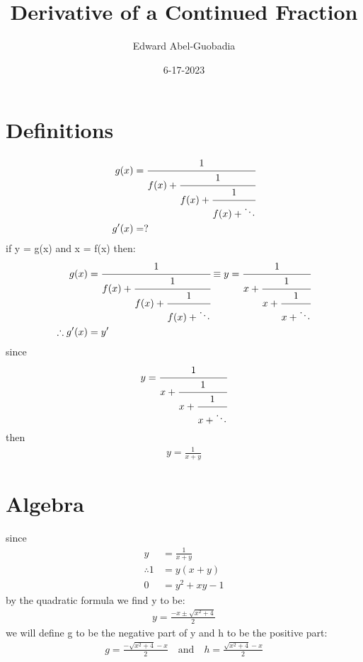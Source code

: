 \documentclass[a4paper]{article}
\title{Derivative of a Continued Fraction}
\author{Edward Abel-Guobadia}
\date{6-17-2023}
\begin{document}
\maketitle
\newpage
\section*{Definitions}
\begin{align}
    g(x) &= \cfrac{1}{f(x) + \cfrac{1}{f(x) + \cfrac{1}{f(x) + \ddots}}}\\
    g^\prime(x) &= ?
\end{align}
if y = g(x) and x = f(x)
then:
\begin{align}
    g(x) &= \cfrac{1}{f(x) + \cfrac{1}{f(x) + \cfrac{1}{f(x) + \ddots}}}
    \equiv y = \cfrac{1}{x + \cfrac{1}{x + \cfrac{1}{x + \ddots}}}\\
    \therefore g^\prime(x) &= y^\prime
\end{align}
since
\begin{align}
    y = \cfrac{1}{x + \cfrac{1}{x + \cfrac{1}{x + \ddots}}}
\end{align}
then
\begin{align}
    y = \frac{1}{x + y} 
\end{align}

\section*{Algebra}
since
\begin{align}
    y &= \frac{1}{x + y}\\
    \therefore 1 &= y(x + y)\\
    0 &= y^2 + xy - 1
\end{align}
by the quadratic formula we find y to be:
\begin{align}
    y = \frac{-x \pm\sqrt{x^2+4}}{2}
\end{align}
we will define g to be the negative part of y and h to be the positive part:
\begin{align}
    g = \frac{-\sqrt{x^2+4} - x}{2} \quad\text{and}\quad h = \frac{\sqrt{x^2+4} - x}{2}
\end{align}
\end{document}
